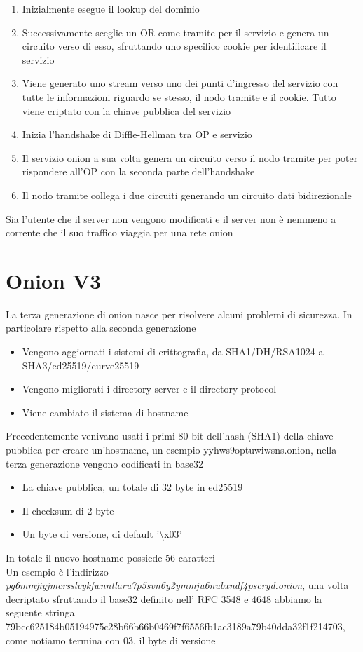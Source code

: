 \begin{enumerate}
    \item Inizialmente esegue il lookup del dominio
    \item Successivamente sceglie un OR come tramite per il servizio e genera un circuito verso di esso, sfruttando uno specifico cookie per identificare il servizio
    \item Viene generato uno stream verso uno dei punti d'ingresso del servizio con tutte le informazioni riguardo se stesso, il nodo tramite e il cookie. Tutto viene criptato con la chiave pubblica del servizio
    \item Inizia l'handshake di Diffle-Hellman tra OP e servizio
    \item Il servizio onion a sua volta genera un circuito verso il nodo tramite per poter rispondere all'OP con la seconda parte dell'handshake
    \item Il nodo tramite collega i due circuiti generando un circuito dati bidirezionale 
\end{enumerate}
Sia l'utente che il server non vengono modificati e il server non è nemmeno a corrente che il suo traffico viaggia per una rete onion \cite{ChaumMixes}
\section{Onion V3}

La terza generazione di onion nasce per risolvere alcuni problemi di sicurezza. In particolare rispetto alla seconda generazione
\begin{itemize}
    \item Vengono aggiornati i sistemi di crittografia, da SHA1/DH/RSA1024 a SHA3/ed25519/curve25519
    \item Vengono migliorati i directory server e il directory protocol
    \item Viene cambiato il sistema di hostname
\end{itemize}
Precedentemente venivano usati i primi 80 bit dell'hash (SHA1) della chiave pubblica per creare un'hostname, un esempio yyhws9optuwiwsns.onion, nella terza generazione vengono codificati in base32
\begin{itemize}
    \item La chiave pubblica, un totale di 32 byte in ed25519
    \item Il checksum di 2 byte
    \item Un byte di versione, di default '\textbackslash x03' 
\end{itemize}
In totale il nuovo hostname possiede 56 caratteri \cite{Torv3} \\
Un esempio è l'indirizzo \emph{pg6mmjiyjmcrsslvykfwnntlaru7p5svn6y2ymmju6nubxndf4pscryd.onion}, una volta decriptato sfruttando il base32 definito nell' RFC 3548 e 4648 abbiamo la seguente stringa 79bcc625184b05194975c28b66b66b0469f7f6556fb1ac3189a79b40dda32f1f214703, come notiamo termina con 03, il byte di versione
